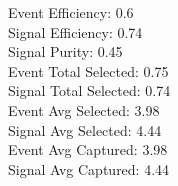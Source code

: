 Event  Efficiency:     0.6\\
Signal Efficiency:     0.74\\
Signal Purity:         0.45\\
Event  Total Selected: 0.75\\
Signal Total Selected: 0.74\\
Event  Avg Selected:   3.98\\
Signal Avg Selected:   4.44\\
Event  Avg Captured:   3.98\\
Signal Avg Captured:   4.44